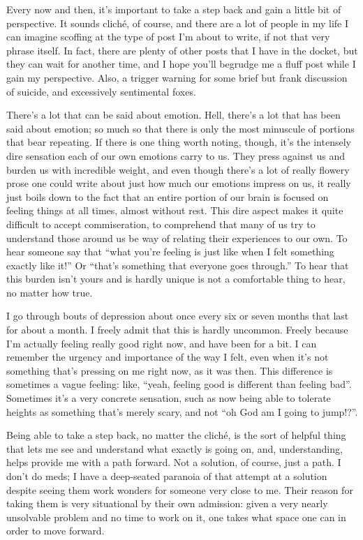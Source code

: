 
Every now and then, it's important to take a step back and gain a little bit of perspective. It sounds clich\'{e}, of course, and there are a lot of people in my life I can imagine scoffing at the type of post I'm about to write, if not that very phrase itself. In fact, there are plenty of other posts that I have in the docket, but they can wait for another time, and I hope you'll begrudge me a fluff post while I gain my perspective.  Also, a trigger warning for some brief but frank discussion of suicide, and excessively sentimental foxes.

There's a lot that can be said about emotion. Hell, there's a lot that has been said about emotion; so much so that there is only the most minuscule of portions that bear repeating. If there is one thing worth noting, though, it's the intensely dire sensation each of our own emotions carry to us. They press against us and burden us with incredible weight, and even though there's a lot of really flowery prose one could write about just how much our emotions impress on us, it really just boils down to the fact that an entire portion of our brain is focused on feeling things at all times, almost without rest. This dire aspect makes it quite difficult to accept commiseration, to comprehend that many of us try to understand those around us be way of relating their experiences to our own. To hear someone say that ``what you're feeling is just like when I felt something exactly like it!'' Or ``that's something that everyone goes through.'' To hear that this burden isn't yours and is hardly unique is not a comfortable thing to hear, no matter how true.

I go through bouts of depression about once every six or seven months that last for about a month. I freely admit that this is hardly uncommon. Freely because I'm actually feeling really good right now, and have been for a bit. I can remember the urgency and importance of the way I felt, even when it's not something that's pressing on me right now, as it was then. This difference is sometimes a vague feeling: like, ``yeah, feeling good is different than feeling bad''. Sometimes it's a very concrete sensation, such as now being able to tolerate heights as something that's merely scary, and not ``oh God am I going to jump!?''.

Being able to take a step back, no matter the cliché, is the sort of helpful thing that lets me see and understand what exactly is going on, and, understanding, helps provide me with a path forward. Not a solution, of course, just a path. I don't do meds; I have a deep-seated paranoia of that attempt at a solution despite seeing them work wonders for someone very close to me. Their reason for taking them is very situational by their own admission: given a very nearly unsolvable problem and no time to work on it, one takes what space one can in order to move forward.

